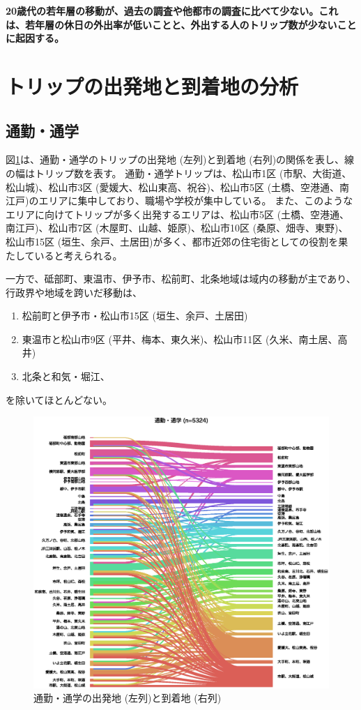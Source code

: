 \documentclass[a4paper,12pt, uplatex]{jsbook}
\begin{document}
\color{red}
\begin{framed}
\noindent
\textbf{\large 20歳代の若年層の移動が、過去の調査や他都市の調査に比べて少ない。これは、若年層の休日の外出率が低いことと、外出する人のトリップ数が少ないことに起因する。}
\end{framed}
\color{black}


\clearpage
\section{トリップの出発地と到着地の分析}
\subsection{通勤・通学}
図\ref{fig:od_commute}は、通勤・通学のトリップの出発地 (左列)と到着地 (右列)の関係を表し、線の幅はトリップ数を表す。
通勤・通学トリップは、松山市1区 (市駅、大街道、松山城)、松山市3区 (愛媛大、松山東高、祝谷)、松山市5区 (土橋、空港通、南江戸)のエリアに集中しており、職場や学校が集中している。
また、このようなエリアに向けてトリップが多く出発するエリアは、松山市5区 (土橋、空港通、南江戸)、松山市7区 (木屋町、山越、姫原)、松山市10区 (桑原、畑寺、東野)、松山市15区 (垣生、余戸、土居田)が多く、都市近郊の住宅街としての役割を果たしていると考えられる。

一方で、砥部町、東温市、伊予市、松前町、北条地域は域内の移動が主であり、行政界や地域を跨いだ移動は、
\begin{enumerate}
  \item 松前町と伊予市・松山市15区 (垣生、余戸、土居田)
  \item 東温市と松山市9区 (平井、梅本、東久米)、松山市11区 (久米、南土居、高井)
  \item 北条と和気・堀江、
\end{enumerate}
を除いてほとんどない。

\begin{figure}[htbp]
    \centering
    \includegraphics[width=1.0\textwidth]{picture/connection_通勤・通学.eps}
    \caption{通勤・通学の出発地 (左列)と到着地 (右列)}
    \label{fig:od_commute}
\end{figure}
\end{document}
